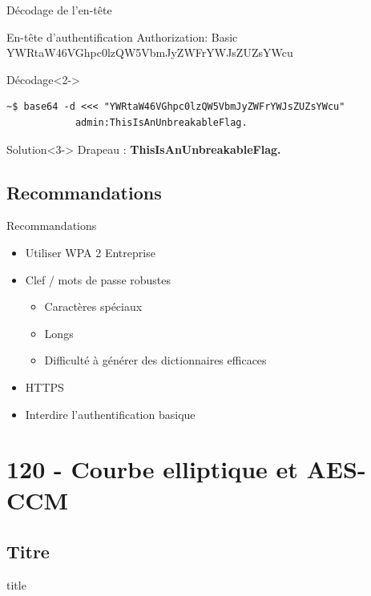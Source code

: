 \documentclass[10pt,sans,usenames,dvipsnames,french,compress]{beamer}
\begin{document}
\begin{frame}[fragile]{Décodage de l'en-tête}
	\begin{block}{En-tête d'authentification}
		Authorization: Basic YWRtaW46VGhpc0lzQW5VbmJyZWFrYWJsZUZsYWcu
	\end{block}

	\begin{block}{Décodage}<2->
		\vspace{-3mm}
		\begin{lstlisting}[style=Term]
			~$ base64 -d <<< "YWRtaW46VGhpc0lzQW5VbmJyZWFrYWJsZUZsYWcu"
			admin:ThisIsAnUnbreakableFlag.
		\end{lstlisting}
		\vspace{-2mm}
	\end{block}

	\begin{exampleblock}{Solution}<3->
		Drapeau : \textbf{ThisIsAnUnbreakableFlag.}
	\end{exampleblock}
\end{frame}

\subsection{Recommandations}
\begin{frame}{Recommandations}
	\begin{itemize}
		\item<2-> Utiliser WPA 2 Entreprise
		\item<3-> Clef / mots de passe robustes
		\begin{itemize}
			\item<4-> Caractères spéciaux
			\item<5-> Longs
			\item<6-> Difficulté à générer des dictionnaires efficaces
		\end{itemize}
		\item<7-> HTTPS
		\item<8-> Interdire l'authentification basique
	\end{itemize}
\end{frame}

\section{120 - Courbe elliptique et AES-CCM}
\subsection{Titre}
\begin{frame}
	\begin{beamercolorbox}[sep=8pt,center]{title}
	\end{beamercolorbox}
\end{frame}
\end{document}

